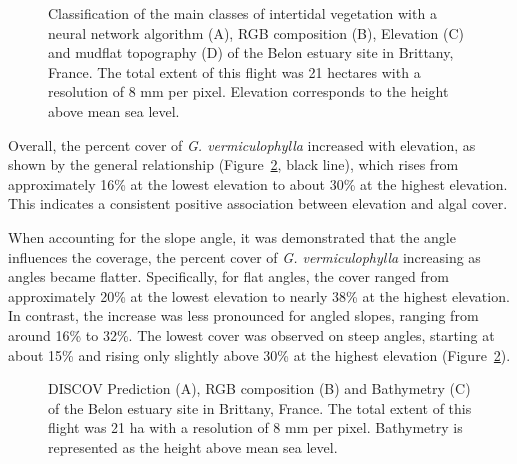 \documentclass[
  letterpaper,
  11pt,
  english,
  singlespacing,
  headsepline]{MastersDoctoralThesis}
\begin{document}
\begin{spacing}{1.5}
\begin{figure}
\caption{\label{fig-Belon}Classification of the main classes of
intertidal vegetation with a neural network algorithm (A), RGB
composition (B), Elevation (C) and mudflat topography (D) of the Belon
estuary site in Brittany, France. The total extent of this flight was 21
hectares with a resolution of 8 mm per pixel. Elevation corresponds to
the height above mean sea level.}

\end{figure}%

Overall, the percent cover of \emph{G. vermiculophylla} increased with
elevation, as shown by the general relationship
(Figure~\ref{fig-Gam_Slope}, black line), which rises from approximately
16\% at the lowest elevation to about 30\% at the highest elevation.
This indicates a consistent positive association between elevation and
algal cover.

When accounting for the slope angle, it was demonstrated that the angle
influences the coverage, the percent cover of \emph{G. vermiculophylla}
increasing as angles became flatter. Specifically, for flat angles, the
cover ranged from approximately 20\% at the lowest elevation to nearly
38\% at the highest elevation. In contrast, the increase was less
pronounced for angled slopes, ranging from around 16\% to 32\%. The
lowest cover was observed on steep angles, starting at about 15\% and
rising only slightly above 30\% at the highest elevation
(Figure~\ref{fig-Gam_Slope}).

\begin{figure}


\caption{\label{fig-Gam_Slope}DISCOV Prediction (A), RGB composition (B)
and Bathymetry (C) of the Belon estuary site in Brittany, France. The
total extent of this flight was 21 ha with a resolution of 8 mm per
pixel. Bathymetry is represented as the height above mean sea level.}


\end{figure}
\end{spacing}
\end{document}
